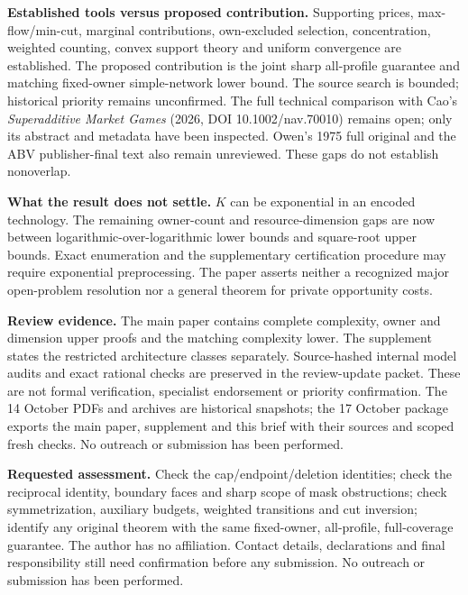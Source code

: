 \documentclass[11pt]{article}
\begin{document}
\textbf{Established tools versus proposed contribution.} Supporting prices,
max-flow/min-cut, marginal contributions, own-excluded selection,
concentration, weighted counting, convex support theory and uniform
convergence are established. The proposed contribution is the joint sharp
all-profile guarantee and matching fixed-owner simple-network lower bound.
The source search is bounded; historical priority remains unconfirmed.
The full technical comparison with Cao's \emph{Superadditive Market Games}
(2026, DOI 10.1002/nav.70010) remains open; only its abstract and metadata
have been inspected. Owen's 1975 full original and the ABV publisher-final
text also remain unreviewed. These gaps do not establish nonoverlap.

\textbf{What the result does not settle.} $K$ can be exponential in an encoded
technology. The remaining owner-count and resource-dimension gaps are now between logarithmic-over-logarithmic lower bounds and square-root upper bounds.
Exact enumeration and the supplementary certification procedure may require
exponential preprocessing. The paper asserts neither a recognized major
open-problem resolution nor a general theorem for private opportunity costs.

\textbf{Review evidence.} The main paper contains complete complexity, owner
and dimension upper proofs and the matching complexity lower. The supplement
states the restricted architecture classes separately. Source-hashed internal
model audits and exact rational checks are preserved in the review-update
packet. These are not formal verification, specialist endorsement or priority
confirmation. The 14 October PDFs and archives are historical snapshots;
the 17 October package exports the main paper, supplement and this brief
with their sources and scoped fresh checks. No outreach or submission has been performed.

\textbf{Requested assessment.} Check the cap/endpoint/deletion identities;
check the reciprocal identity, boundary faces and sharp scope of mask obstructions;
check symmetrization, auxiliary budgets, weighted transitions and cut inversion;
identify any original theorem with the same fixed-owner, all-profile,
full-coverage guarantee. The author has no affiliation. Contact details,
declarations and final responsibility still need confirmation before any submission. No outreach
or submission has been performed.
\end{document}
